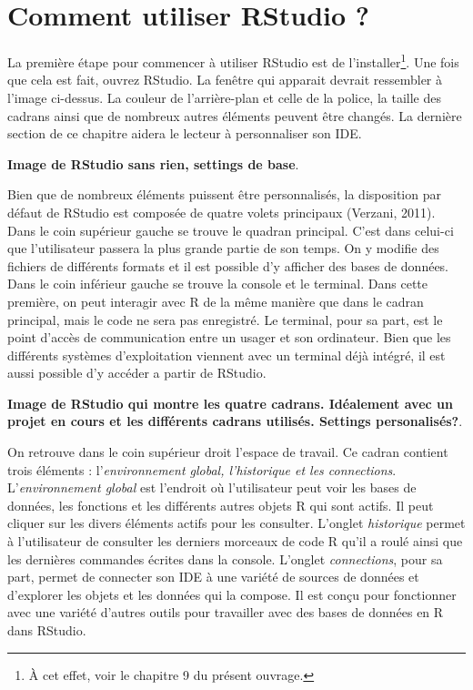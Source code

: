 \documentclass[
  letterpaper,
]{scrbook}
\begin{document}
\hypertarget{comment-utiliser-rstudio}{%
\section{Comment utiliser RStudio ?}\label{comment-utiliser-rstudio}}

La première étape pour commencer à utiliser RStudio est de
l'installer\footnote{À cet effet, voir le chapitre 9 du présent ouvrage.}.
Une fois que cela est fait, ouvrez RStudio. La fenêtre qui apparait
devrait ressembler à l'image ci-dessus. La couleur de l'arrière-plan et
celle de la police, la taille des cadrans ainsi que de nombreux autres
éléments peuvent être changés. La dernière section de ce chapitre aidera
le lecteur à personnaliser son IDE.

\textbf{Image de RStudio sans rien, settings de base}.

Bien que de nombreux éléments puissent être personnalisés, la
disposition par défaut de RStudio est composée de quatre volets
principaux (Verzani, 2011). Dans le coin supérieur gauche se trouve le
quadran principal. C'est dans celui-ci que l'utilisateur passera la plus
grande partie de son temps. On y modifie des fichiers de différents
formats et il est possible d'y afficher des bases de données. Dans le
coin inférieur gauche se trouve la console et le terminal. Dans cette
première, on peut interagir avec R de la même manière que dans le cadran
principal, mais le code ne sera pas enregistré. Le terminal, pour sa
part, est le point d'accès de communication entre un usager et son
ordinateur. Bien que les différents systèmes d'exploitation viennent
avec un terminal déjà intégré, il est aussi possible d'y accéder a
partir de RStudio.

\textbf{Image de RStudio qui montre les quatre cadrans. Idéalement avec
un projet en cours et les différents cadrans utilisés. Settings
personalisés?}.

On retrouve dans le coin supérieur droit l'espace de travail. Ce cadran
contient trois éléments : l'\emph{environnement global, l'historique et
les connections}. L'\emph{environnement global} est l'endroit où
l'utilisateur peut voir les bases de données, les fonctions et les
différents autres objets R qui sont actifs. Il peut cliquer sur les
divers éléments actifs pour les consulter. L'onglet \emph{historique}
permet à l'utilisateur de consulter les derniers morceaux de code R
qu'il a roulé ainsi que les dernières commandes écrites dans la console.
L'onglet \emph{connections}, pour sa part, permet de connecter son IDE à
une variété de sources de données et d'explorer les objets et les
données qui la compose. Il est conçu pour fonctionner avec une variété
d'autres outils pour travailler avec des bases de données en R dans
RStudio.
\end{document}
